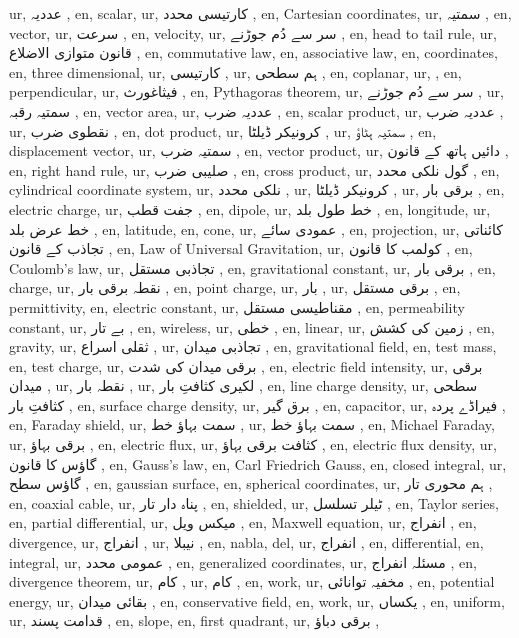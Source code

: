 ur, عددیہ ,
en, scalar,
ur, کارتیسی محدد ,
en, Cartesian coordinates,
ur, سمتیہ ,
en, vector,
ur, سرعت ,
en, velocity,
ur, سر سے دُم جوڑنے ,
en, head to tail rule,
ur, قانون متوازی الاضلاع ,
en, commutative law,
en, associative law,
en, coordinates,
en, three dimensional,
ur, کارتیسی ,
ur, ہم سطحی ,
en, coplanar,
ur,   ,
en, perpendicular,
ur, فیثاغورث ,
en, Pythagoras theorem,
ur, سر سے دُم جوڑنے ,
ur, سمتیہ رقبہ ,
en, vector area,
ur, عددیہ ضرب ,
en, scalar product,
ur, عددیہ ضرب ,
ur, نقطوی ضرب ,
en, dot product,
ur, کرونیکر ڈیلٹا ,
ur, سمتیہ ہٹاؤ ,
en, displacement vector,
ur, سمتیہ ضرب ,
en, vector product,
ur, دائیں ہاتھ کے قانون ,
en, right hand rule,
ur, صلیبی ضرب ,
en, cross product,
ur, گول نلکی محدد ,
en, cylindrical coordinate system,
ur, نلکی محدد ,
ur, کرونیکر ڈیلٹا ,
ur, برقی بار ,
en, electric charge,
ur, جفت قطب ,
en, dipole,
ur, خط طول بلد ,
en, longitude,
ur, خط عرض بلد ,
en, latitude,
en, cone,
ur, عمودی سائے ,
en, projection,
ur, کائناتی تجاذب کے قانون ,
en, Law of Universal Gravitation,
ur, کولمب کا قانون ,
en, Coulomb's law,
ur, تجاذبی مستقل ,
en, gravitational constant,
ur, برقی بار ,
en, charge,
ur, نقطہ برقی بار ,
en, point charge,
ur, بار ,
ur, برقی مستقل ,
en, permittivity,
en, electric constant,
ur, مقناطیسی مستقل ,
en, permeability constant,
ur, بے تار ,
en, wireless,
ur, خطی ,
en, linear,
ur, زمین کی کشش ,
en, gravity,
ur, ثقلی اسراع ,
ur, تجاذبی میدان ,
en, gravitational field,
en, test mass,
en, test charge,
ur, برقی میدان کی شدت ,
en, electric field intensity,
ur, برقی میدان ,
ur, نقطہ بار ,
ur, لکیری کثافتِ بار ,
en, line charge density,
ur, سطحی کثافتِ بار ,
en, surface charge density,
ur, برق گیر ,
en, capacitor,
ur, فیراڈے پردہ ,
en, Faraday shield,
ur, سمت بہاؤ خط ,
ur, سمت بہاؤ خط ,
en, Michael Faraday,
ur, برقی بہاؤ ,
en, electric flux,
ur, کثافت برقی بہاؤ ,
en, electric flux density,
ur, گاؤس کا قانون ,
en, Gauss's law,
en, Carl Friedrich Gauss,
en, closed integral,
ur, گاؤس سطح ,
en, gaussian surface,
en, spherical coordinates,
ur, ہم محوری تار ,
en, coaxial cable,
ur, پناہ دار تار ,
en, shielded,
ur, ٹیلر تسلسل ,
en, Taylor series,
en, partial differential,
ur, میکس ویل ,
en, Maxwell equation,
ur, انفراج ,
en, divergence,
ur, انفراج ,
ur, نیبلا ,
en, nabla, del,
ur, انفراج ,
en, differential,
en, integral,
ur, عمومی محدد ,
en, generalized coordinates,
ur, مسئلہ انفراج ,
en, divergence theorem,
ur, کام ,
ur, کام ,
en, work,
ur, مخفیہ توانائی ,
en, potential energy,
ur, بقائی میدان ,
en, conservative field,
en, work,
ur, یکساں ,
en, uniform,
ur, قدامت پسند ,
en, slope,
en, first quadrant,
ur, برقی دباؤ ,
